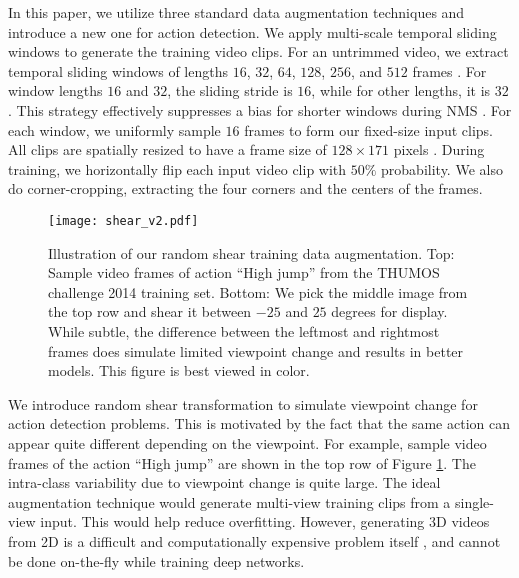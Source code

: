 \documentclass[10pt,twocolumn,letterpaper]{article}
\begin{document}
In this paper, we utilize three standard data augmentation techniques and introduce a new one for action detection.
We apply multi-scale temporal sliding windows to generate the training video clips. For an untrimmed video, we extract temporal sliding windows of lengths $16$, $32$, $64$, $128$, $256$, and $512$ frames \cite{scnn_shou_wang_chang_cvpr16}. For window lengths $16$ and $32$, the sliding stride is $16$, while for other lengths, it is $32$. This strategy effectively suppresses a bias for shorter windows during NMS \cite{compact_fisher_action_oneata_iccv13}. For each window, we uniformly sample $16$ frames to form our fixed-size input clips. All clips are spatially resized to have a frame size of $128 \times 171$ pixels \cite{c3d2015}.  
During training, we horizontally flip each input video clip with $50\%$ probability. We also do corner-cropping, extracting the four corners and the centers of the frames.

\begin{figure}[t]
	\centering
	\texttt{[image: shear\_v2.pdf]}
	\vspace{-20ex}
	\caption{Illustration of our random shear training data augmentation. Top: Sample video frames of action ``High jump'' from the THUMOS challenge 2014 training set.  Bottom: We pick the middle image from the top row and shear it between $-25$ and $25$ degrees for display. While subtle, the difference between the leftmost and rightmost frames does simulate limited viewpoint change and results in better models. This figure is best viewed in color. }
	\label{fig:shear}
	\vspace{-2ex}
\end{figure}

We introduce random shear transformation to simulate viewpoint change for action detection problems. This is motivated by the fact that the same action can appear quite different depending on the viewpoint. For example, sample video frames of the action ``High jump'' are shown in the top row of Figure \ref{fig:shear}. The intra-class variability due to viewpoint change is quite large. The ideal augmentation technique would generate multi-view training clips from a single-view input. This would help reduce overfitting. However, generating 3D videos from 2D is a difficult and computationally expensive problem itself \cite{2dto3d_pose_eccv12_rama,DeepStereo2015,3d_shapenet_cvpr15_wu}, and cannot be done on-the-fly while training deep networks. 
\end{document}
